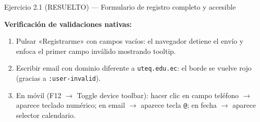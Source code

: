 \begin{cajaejercicio}{Ejercicio 2.1 (RESUELTO) --- Formulario de registro completo y accesible}
\begin{center}
\end{center}

\textbf{Verificación de validaciones nativas:}
\begin{enumerate}
\item Pulsar «Registrarme» con campos vacíos: el navegador detiene el
envío y enfoca el primer campo inválido mostrando tooltip.
\item Escribir email con dominio diferente a \texttt{uteq.edu.ec}:
el borde se vuelve rojo (gracias a \texttt{:user-invalid}).
\item En móvil (F12 $\to$ Toggle device toolbar): hacer clic en
campo teléfono $\to$ aparece teclado numérico; en email $\to$ aparece
tecla \texttt{@}; en fecha $\to$ aparece selector calendario.
\end{enumerate}
\end{cajaejercicio}


